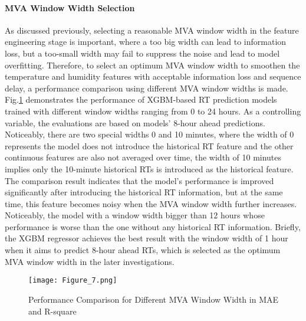 \documentclass[11pt]{article}
\begin{document}
    \paragraph{MVA Window Width Selection}
    As discussed previously, selecting a reasonable MVA window width in the feature engineering stage is important, where a too big width can lead to information loss, but a too-small width may fail to suppress the noise and lead to model overfitting. Therefore, to select an optimum MVA window width to smoothen the temperature and humidity features with acceptable information loss and sequence delay, a performance comparison using different MVA window widths is made. Fig.\ref{MVA_window} demonstrates the performance of XGBM-based RT prediction models trained with different window widths ranging from 0 to 24 hours. As a controlling variable, the evaluations are based on models’ 8-hour ahead predictions. Noticeably, there are two special widths 0 and 10 minutes, where the width of 0 represents the model does not introduce the historical RT feature and the other continuous features are also not averaged over time, the width of 10 minutes implies only the 10-minute historical RTs is introduced as the historical feature. The comparison result indicates that the model’s performance is improved significantly after introducing the historical RT information, but at the same time, this feature becomes noisy when the MVA window width further increases. Noticeably, the model with a window width bigger than 12 hours whose performance is worse than the one without any historical RT information. Briefly, the XGBM regressor achieves the best result with the window width of 1 hour when it aims to predict 8-hour ahead RTs, which is selected as the optimum MVA window width in the later investigations.
    
    \begin{figure}[htbp]
    	\centering
    	\texttt{[image: Figure\_7.png]}
    	\caption{Performance Comparison for Different MVA Window Width in MAE and R-square}
    	\label{MVA_window}
    \end{figure}    
    
\end{document}
